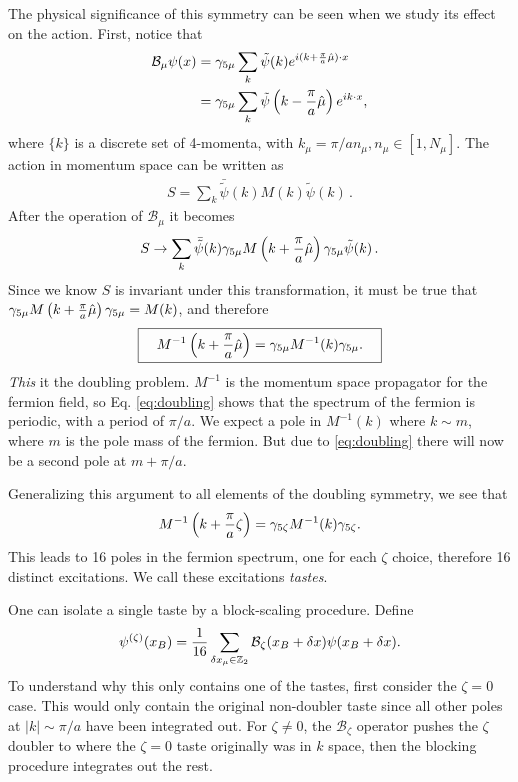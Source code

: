 The physical significance of this symmetry can be seen when we study its effect on the action. First, notice that
\begin{align}
  \mathcal{B}_{\mu} \psi(x) & = \gamma_{5\mu} \sum_k \tilde{\psi}(k) e^{i(k+{\pi\over a}\hat{\mu})\cdot x} \\
  & = \gamma_{5\mu} \sum_k \tilde{\psi}\left(k-{\pi\over a}\hat{\mu}\right)e^{ik\cdot x},
\end{align}
where $\{k\}$ is a discrete set of 4-momenta, with $k_{\mu}=\pi/an_{\mu}, n_{\mu}\in[1,N_{\mu}]$. The action in momentum space can be written as
\begin{align}
  S = \sum_k \bar{\tilde{\psi}}(k) M(k) \tilde{\psi}(k)\,.
\end{align}
After the operation of $\mathcal{B}_{\mu}$ it becomes
\begin{align}
  S \to \sum_k \bar{\tilde{\psi}}(k) \gamma_{5\mu} M\left(k+{\pi\over a}\hat{\mu}\right)\gamma_{5\mu} \tilde{\psi}(k)\,.
\end{align}
Since we know $S$ is invariant under this transformation, it must be true that $\gamma_{5\mu} M\left(k+{\pi\over a}\hat{\mu}\right)\gamma_{5\mu} = M(k)$, and therefore
\begin{align}
  \boxed{  \quad M^{-1}\left(k+{\pi\over a}\hat{\mu}\right) = \gamma_{5\mu} M^{-1}(k) \gamma_{5\mu}. \quad}
  \label{eq:doubling}
\end{align}
    {\it{This}} it the doubling problem. $M^{-1}$ is the momentum space propagator for the fermion field, so Eq. \eqref{eq:doubling} shows that the spectrum of the fermion is periodic, with a period of $\pi/a$. We expect a pole in $M^{-1}(k)$ where $k \sim m$, where $m$ is the pole mass of the fermion. But due to \eqref{eq:doubling} there will now be a second pole at $m + \pi/a$. %

    Generalizing this argument to all elements of the doubling symmetry, we see that
    \begin{align}
      M^{-1}\left(k+{\pi\over a}\zeta\right) = \gamma_{5\zeta} M^{-1}(k) \gamma_{5\zeta}.
    \end{align}
    This leads to 16 poles in the fermion spectrum, one for each $\zeta$ choice, therefore 16 distinct excitations. We call these excitations \textit{tastes}.

    One can isolate a single taste by a block-scaling procedure. Define
    \begin{align}
      \psi^{(\zeta)}(x_B) = {1\over 16} \sum_{\delta x_{\mu} \in \mathbb{Z}_2} \mathcal{B}_{\zeta}(x_B + \delta x) \psi(x_B + \delta x).
      \label{eq:block-scaling}
    \end{align}
To understand why this only contains one of the tastes, first consider the $\zeta = 0$ case. This would only contain the original non-doubler taste since all other poles at $|k|\sim\pi/a$ have been integrated out. For $\zeta \neq 0$, the $\mathcal{B}_{\zeta}$ operator pushes the $\zeta$ doubler to where the $\zeta=0$ taste originally was in $k$ space, then the blocking procedure integrates out the rest.

